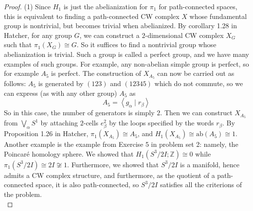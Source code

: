     \begin{proof}
        (1) Since $H_1$ is just the abelianization for
        $\pi_1$ for path-connected spaces,
        this is equivalent to finding
        a path-connected CW complex
        $X$ whose fundamental group is nontrivial, but
        becomes trivial when abelianized. 
        By corollary 1.28 in Hatcher, for any
        group $G$, we can construct a $2$-dimensional CW
        complex $X_G$ such that $\pi_1 (X_G) \cong G$.
        So it suffices to find a nontrivial group whose
        abelianization is trivial. Such a group is
        called a perfect group, and we have
        many examples of such groups. For example,
        any non-abelian simple group is perfect, so
        for example $A_5$ is perfect. 
        The construction of $X_{A_5}$  can now be
        carried out as follows: $A_5$ is 
        generated by
        $\left( 123 \right) $ and
        $\left( 12345 \right) $ which do not commute,
        so we can express (as with any other group)
        $A_5$ as
        \[
        A_5 = \left< g_{\alpha} \mid r_{\beta} \right>
        \] 
        So in this case, the number of generators is simply $2$.
        Then we can construct $X_{A_5}$ from
        $\bigvee_{\alpha} S^{1}$ by attaching
        $2$-cells $e_{\beta}^2$ by the loops specified by
        the words $r_{\beta}$. By Proposition 1.26 in Hatcher,
        $\pi_1 \left( X_{A_5} \right) \cong
        A_5$, and
        $H_1 \left( X_{A_5} \right) 
        \cong \text{ab}\left( A_5 \right) \cong 1 $.\\
        \linebreak
        Another example is the example from
        Exercise 5 in problem set 2: namely,
        the Poincaré homology sphere. We showed that
        $H_1 \left( S^3 / 2 I ; \mathbb{Z} \right) \cong
        0$ while
        $\pi_1 \left( S^3 / 2 I  \right) \cong 2 I \not \cong 1$.
        Furthermore, we showed that
        $S^3 / 2I$ is a manifold, hence admits a CW complex
        structure, and furthermore, as the quotient of
        a path-connected space, it is also path-connected, so
        $S^3 / 2I$ satisfies all the 
        criterions of the problem.\\
        \linebreak


\end{proof}
